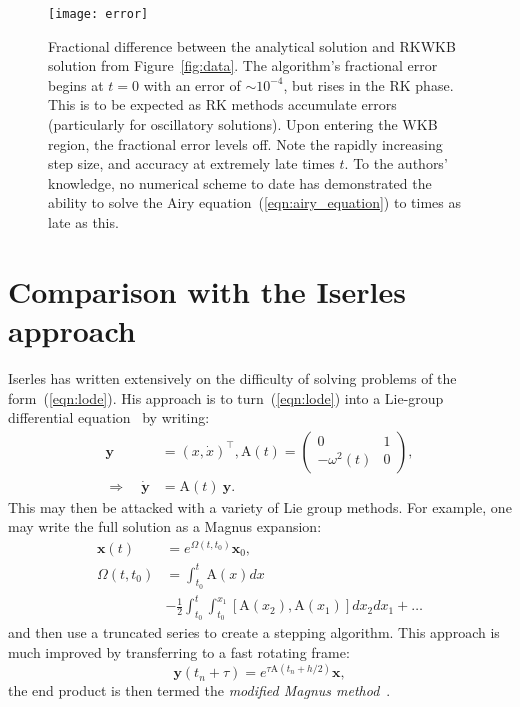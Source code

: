 \begin{figure}[]
  \centering
  \texttt{[image: error]}
  \caption{Fractional difference between the analytical solution and RKWKB solution from Figure~\protect\ref{fig:data}. The algorithm's fractional error begins at $t=0$ with an error of $\sim10^{-4}$, but rises in the RK phase. This is to be expected as RK methods accumulate errors (particularly for oscillatory solutions). Upon entering the WKB region, the fractional error levels off. Note the rapidly increasing step size, and accuracy at extremely late times $t$. To the authors' knowledge, no numerical scheme to date has demonstrated the ability to solve the Airy equation~(\protect\ref{eqn:airy_equation}) to times as late as this.\label{fig:error}}
\end{figure}




\section{Comparison with the Iserles approach}
\label{sec:iserles_comparison}
Iserles has written extensively on the difficulty of solving problems of the form~(\ref{eqn:lode}). His approach is to turn~(\ref{eqn:lode}) into a Lie-group differential equation~\citep{Iserles00lie-groupmethods} by writing:
\begin{align}
  \mathbf{y} &= (x,\dot{x})^\top, 
  \mathrm{A}(t) = 
  \left(
  \begin{array}{cc}
    0 & 1 \\
    -\omega^2(t) & 0
  \end{array}
  \right),
  \nonumber\\
  \Rightarrow\quad 
  \dot{\mathbf{y}} &= \mathrm{A}(t) \: \mathbf{y}.
  \label{eqn:lie_eqn}
\end{align}
This may then be attacked with a variety of Lie group methods. For example, one may write the full solution as a Magnus expansion:
\begin{align}
  \mathbf{x}(t) &= e^{\Omega(t,t_0)} \mathbf{x}_0,
  \label{eqn:magnus}\\
  \Omega(t,t_0) &= \int_{t_0}^t \mathrm{A}(x) dx \nonumber \\
  &- \frac{1}{2}\int_{t_0}^t\int_{t_0}^{x_1} \left[\mathrm{A}(x_2),\mathrm{A}(x_1)\right] dx_2 dx_1 + \ldots
  \nonumber
\end{align}
and then use a truncated series to create a stepping algorithm.
This approach is much improved by transferring to a fast rotating frame:
\begin{equation}
  \mathbf{y}(t_n+\tau) = e^{\tau \mathrm{A}(t_n+h/2)} \mathbf{x},
  \label{eqn:rotating_frame}
\end{equation}
the end product is then termed the {\em modified Magnus method}~\citep{Iserles01thinkglobally}.

